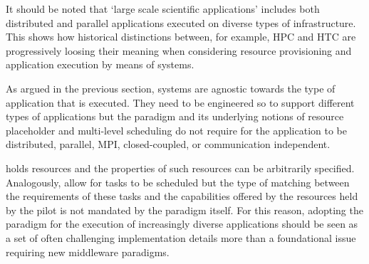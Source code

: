 \documentclass{sig-alternate}
\begin{document}

It should be noted that `large scale scientific applications' includes both
distributed and parallel applications executed on diverse types of
infrastructure. This shows how historical distinctions between, for example,
HPC and HTC are progressively loosing their meaning when considering resource
provisioning and application execution by means of \pilot systems.

As argued in the previous section, \pilot systems are agnostic towards the type
of application that is executed. They need to be engineered so to support
different types of applications but the \pilot paradigm and its underlying
notions of resource placeholder and multi-level scheduling do not require for
the application to be distributed, parallel, MPI, closed-coupled, or
communication independent.

\pilots holds resources and the properties of such resources can be arbitrarily
specified. Analogously, \pilots allow for tasks to be scheduled but the type of
matching between the requirements of these tasks and the capabilities offered by
the resources held by the pilot is not mandated by the \pilot paradigm itself.
For this reason, adopting the \pilot paradigm for the execution of increasingly
diverse applications should be seen as a set of often challenging implementation
details more than a foundational issue requiring new middleware paradigms.


\end{document}
